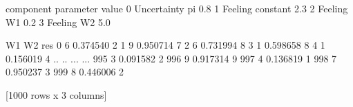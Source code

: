 \documentclass[letterpaper,10pt,english]{sphinxmanual}
\begin{document}
\noindent{}
\def\sphinxLiteralBlockLabel{\label{\detokenize{manual:id48}}}
\begin{sphinxVerbatim}[commandchars=\\\{\},numbers=left,firstnumber=1,stepnumber=1]
\end{sphinxVerbatim}

\begin{sphinxVerbatim}[commandchars=\\\{\}]
     component parameter  value
0  Uncertainty        pi    0.8
1      Feeling  constant    2.3
2      Feeling        W1    0.2
3      Feeling        W2   \PYGZhy{}5.0
\end{sphinxVerbatim}
\def\sphinxLiteralBlockLabel{\label{\detokenize{manual:id49}}}
\begin{sphinxVerbatim}[commandchars=\\\{\},numbers=left,firstnumber=1,stepnumber=1]
\end{sphinxVerbatim}

\begin{sphinxVerbatim}[commandchars=\\\{\}]
     W1        W2  res
0     6  0.374540    2
1     9  0.950714    7
2     6  0.731994    8
3     1  0.598658    8
4     1  0.156019    4
..   ..       ...  ...
995   3  0.091582    2
996   9  0.917314    9
997   4  0.136819    1
998   7  0.950237    3
999   8  0.446006    2

[1000 rows x 3 columns]
\end{sphinxVerbatim}
\end{document}
